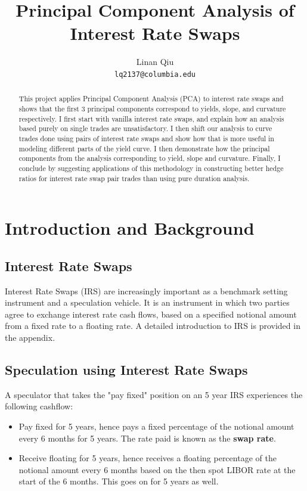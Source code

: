 \documentclass[11pt]{scrreprt}
\title{Principal Component Analysis of Interest Rate Swaps}
\author{Linan Qiu\\\texttt{lq2137@columbia.edu}}
\begin{document}
\maketitle

\setcounter{tocdepth}{1}
\tableofcontents

\begin{abstract}
This project applies Principal Component Analysis (PCA) to interest rate swaps and shows that the first 3 principal components correspond to yields, slope, and curvature respectively. I first start with vanilla interest rate swaps, and explain how an analysis based purely on single trades are unsatisfactory. I then shift our analysis to curve trades done using pairs of interest rate swaps and show how that is more useful in modeling different parts of the yield curve. I then demonstrate how the principal components from the analysis corresponding to yield, slope and curvature. Finally, I conclude by suggesting applications of this methodology in constructing better hedge ratios for interest rate swap pair trades than using pure duration analysis.
\end{abstract}

\chapter{Introduction and Background}
\section{Interest Rate Swaps}

Interest Rate Swaps (IRS) are increasingly important as a benchmark setting instrument and a speculation vehicle. It is an instrument in which two parties agree to exchange interest rate cash flows, based on a specified notional amount from a fixed rate to a floating rate. A detailed introduction to IRS is provided in the appendix.

\section{Speculation using Interest Rate Swaps}
A speculator that takes the "pay fixed" position on an 5 year IRS experiences the following cashflow:

\begin{itemize}
\item Pay fixed for 5 years, hence pays a fixed percentage of the notional amount every 6 months for 5 years. The rate paid is known as the \textbf{swap rate}.
\item Receive floating for 5 years, hence receives a floating percentage of the notional amount every 6 months based on the then spot LIBOR rate at the start of the 6 months. This goes on for 5 years as well.
\end{itemize}
\end{document}
